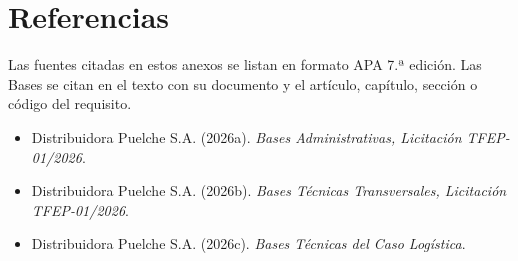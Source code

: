 \clearpage
\section*{Referencias}
{}

Las fuentes citadas en estos anexos se listan en formato APA 7.ª edición. Las Bases se citan en el texto con su documento y el artículo, capítulo, sección o código del requisito.

\begin{itemize}
\item Distribuidora Puelche S.A. (2026a). \emph{Bases Administrativas, Licitación TFEP-01/2026}.
\item Distribuidora Puelche S.A. (2026b). \emph{Bases Técnicas Transversales, Licitación TFEP-01/2026}.
\item Distribuidora Puelche S.A. (2026c). \emph{Bases Técnicas del Caso Logística}.

\end{itemize}
\normalsize

